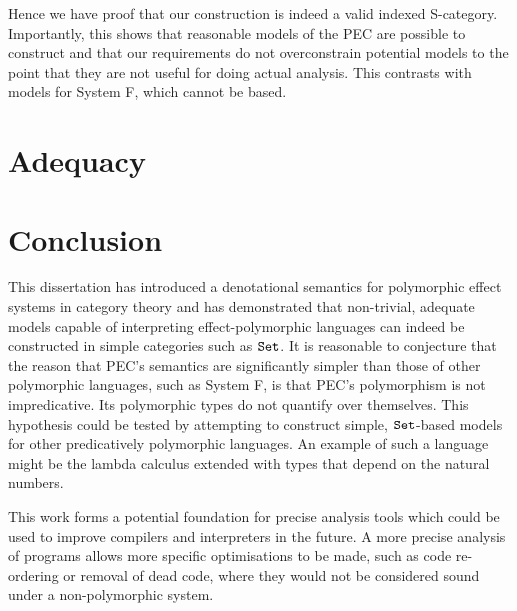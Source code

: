 \documentclass{Report}
\begin{document}
Hence we have proof that our construction is indeed a valid indexed S-category. Importantly, this shows that reasonable models of the PEC are possible to construct and that our requirements do not overconstrain potential models to the point that they are not useful for doing actual analysis. This contrasts with models for System F, which cannot be \set\s based\cite{PolymorphismIsNotSetTheoretic}.

\chapter{Adequacy}


\chapter{Conclusion}
This dissertation has introduced a denotational semantics for polymorphic effect systems in category theory and has demonstrated that non-trivial, adequate models capable of interpreting effect-polymorphic languages can indeed be constructed in simple categories such as $\texttt{Set}$. It is reasonable to conjecture that the reason that PEC's semantics are significantly simpler than those of other polymorphic languages, such as System F, is that PEC's polymorphism is not impredicative. Its polymorphic types do not quantify over themselves. This hypothesis could be tested by attempting to construct simple, $\texttt{Set}$-based models for other predicatively polymorphic languages. An example of such a language might be the lambda calculus extended with types that depend on the natural numbers.

This work forms a potential foundation for precise analysis tools which could be used to improve compilers and interpreters in the future. A more precise analysis of programs allows more specific optimisations to be made, such as code re-ordering or removal of dead code, where they would not be considered sound under a non-polymorphic system.

 




\appendix





\end{document}
